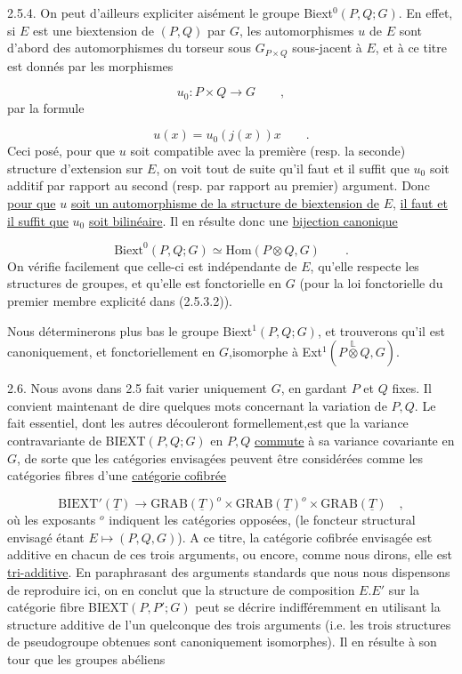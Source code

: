 2.5.4. On peut d'ailleurs expliciter aisément le groupe Biext$^{0}(P,Q;G)$. En effet, si $E$ est une biextension de $(P,Q)$ par $G$, les automorphismes $u$ de $E$ sont d'abord des automorphismes du torseur sous $G_{P\times Q}$ sous-jacent à $E$, et à ce titre est donnés par les morphismes

\begin{equation*}
u_{0} : P\times Q \longrightarrow G \qquad ,
\end{equation*}
par la formule

\begin{equation*}
u(x) = u_{0}(j(x))x \qquad .
\end{equation*}
Ceci posé, pour que $u$ soit compatible avec la première (resp. la seconde) structure d'extension sur $E$, on voit tout de suite qu'il faut et il suffit que $u_{0}$ soit additif par rapport au second (resp. par rapport au premier) argument. Donc \underline{pour que} $u$ \underline{soit un automorphisme de la structure de biextension de} $E$, \underline{il faut et il suffit que} $u_{0}$ \underline{soit bilinéaire}. Il en résulte donc une \underline{bijection canonique}

\begin{equation}\tag{2.5.4.1}
\mathrm{Biext}^{0}(P,Q;G) \simeq \mathrm{Hom}(P\otimes Q,G) \qquad .
\end{equation}
On vérifie facilement que celle-ci est indépendante de $E$, qu'elle respecte les structures de groupes, et qu'elle est fonctorielle en $G$ (pour la loi fonctorielle du premier membre explicité dans (2.5.3.2)).

Nous déterminerons plus bas le groupe Biext$^{1}(P,Q;G)$, et trouverons qu'il est canoniquement, et fonctoriellement en $G$,isomorphe à Ext$^{1}(P \overset{\mathbb{L}}{\otimes} Q, G)$.

2.6. Nous avons dans 2.5 fait varier uniquement $G$, en gardant $P$ et $Q$ fixes. Il convient maintenant de dire quelques mots concernant la variation de $P,Q$. Le fait essentiel, dont les autres découleront formellement,est que la variance contravariante de BIEXT$(P,Q;G)$ en $P,Q$ \underline{commute} à sa variance covariante en $G$, de sorte que les catégories envisagées peuvent être considérées
comme les catégories fibres d'une \underline{catégorie cofibrée}

\begin{equation}\tag{2.6.1}
\mathrm{BIEXT}'(\underline{T}) \longrightarrow \mathrm{GRAB}(\underline{T})^{o}\times\mathrm{GRAB}(\underline{T})^{o}\times \mathrm{GRAB}(\underline{T}) \quad ,
\end{equation}
où les exposants $^{o}$ indiquent les catégories opposées, (le foncteur structural envisagé étant $E \longmapsto (P,Q,G)$). A ce titre, la catégorie cofibrée envisagée est additive en chacun de ces trois arguments, ou encore, comme nous dirons, elle est \underline{tri-additive}. En paraphrasant des arguments standards que nous nous dispensons de reproduire ici, on en conclut que la structure de composition $E.E'$ sur la catégorie fibre BIEXT$(P,P';G)$ peut se décrire indifféremment en utilisant la structure additive de l'un quelconque des trois arguments (i.e. les trois structures de pseudogroupe obtenues sont canoniquement isomorphes). Il en résulte à son tour que les groupes abéliens

